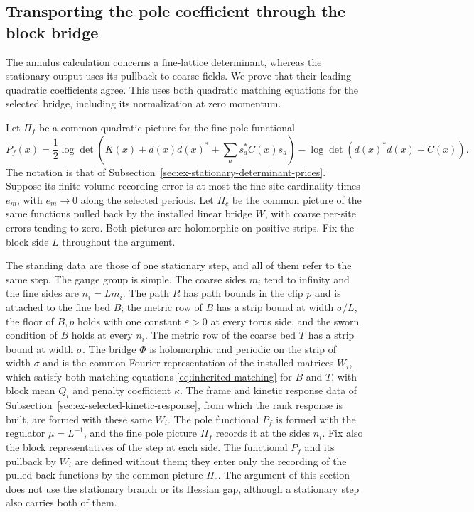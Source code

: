\subsection{Transporting the pole coefficient through the block bridge}
\label{sec:ex-quadratic-pole-transport}

The annulus calculation concerns a fine-lattice determinant, whereas
the stationary output uses its pullback to coarse fields. We prove
that their leading quadratic coefficients agree. This uses both
quadratic matching equations for the selected bridge, including its
normalization at zero momentum.

Let $\Pi_f$ be a common quadratic picture for the fine pole functional
\[
 P_f(x)=\frac12\log\det\left(K(x)+d(x)d(x)^*
                         +\sum_a s_a^*C(x)s_a\right)
                      -\log\det\left(d(x)^*d(x)+C(x)\right).
\]
The notation is that of
Subsection~\ref{sec:ex-stationary-determinant-prices}. Suppose its
finite-volume recording error is at most the fine site cardinality
times $e_m$, with $e_m\to0$ along the selected periods. Let $\Pi_c$
be the common picture of the same functions pulled back by the
installed linear bridge $W$, with coarse per-site errors tending
to zero. Both pictures are holomorphic on positive strips. Fix the
block side $L$ throughout the argument.

The standing data are those of one stationary step, and all of them
refer to the same step. The gauge group is simple. The coarse sides
$m_i$ tend to infinity and the fine sides are $n_i=Lm_i$. The path $R$
has path bounds in the clip $p$ and is attached to the fine bed $B$;
the metric row of $B$ has a strip bound at width $\sigma/L$, the
floor of $B,p$ holds with one constant $\varepsilon>0$ at every torus
side, and the sworn condition of $B$ holds at every $n_i$. The metric
row of the coarse bed $T$ has a strip bound at width $\sigma$. The
bridge $\Phi$ is holomorphic and periodic on the strip of width
$\sigma$ and is the common Fourier representation of the installed
matrices $W_i$, which satisfy both matching equations
\eqref{eq:inherited-matching} for $B$ and $T$, with block mean $Q_i$
and penalty coefficient $\kappa$. The frame and kinetic response data
of Subsection~\ref{sec:ex-selected-kinetic-response}, from which the rank
response is built, are formed with these same $W_i$. The pole
functional $P_f$ is formed with the regulator $\mu=L^{-1}$, and the
fine pole picture $\Pi_f$ records it at the sides $n_i$. Fix also the
block representatives of the step at each side. The functional $P_f$
and its pullback by $W_i$ are defined without them; they enter only
the recording of the pulled-back functions by the common picture
$\Pi_c$. The argument
of this section does not use the stationary branch or its Hessian gap,
although a stationary step also carries both of them.

